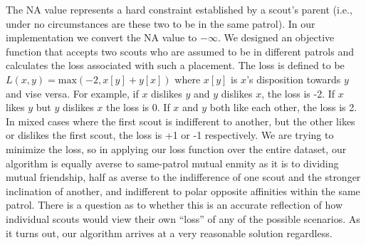 \documentclass{amsart}
\theoremstyle{definition}
\theoremstyle{remark}
\numberwithin{equation}{section}
\begin{document}
The NA value represents a hard constraint established by a scout’s parent (i.e., under no circumstances are these two to be in the same patrol). In our implementation we convert the NA value to $-\infty$. We designed an objective function that accepts two scouts who are assumed to be in different patrols and calculates the loss associated with such a placement. The loss is defined to be $L(x, y) = \text{max}(-2, x[y] + y[x])$ where $x[y]$ is $x$’s disposition towards $y$ and vise versa. For example, if $x$ dislikes $y$ and $y$ dislikes $x$, the loss is -2. If $x$ likes $y$ but $y$ dislikes $x$ the loss is 0. If $x$ and $y$ both like each other, the loss is 2. In mixed cases where the first scout is indifferent to another, but the other likes or dislikes the first scout, the loss is +1 or -1 respectively. We are trying to minimize the loss, so in applying our loss function over the entire dataset, our algorithm is equally averse to same-patrol mutual enmity as it is to dividing mutual friendship, half as averse to the indifference of one scout and the stronger inclination of another, and indifferent to polar opposite affinities within the same patrol. There is a question as to whether this is an accurate reflection of how individual scouts would view their own “loss” of any of the possible scenarios. As it turns out, our algorithm arrives at a very reasonable solution regardless. 
\end{document}
